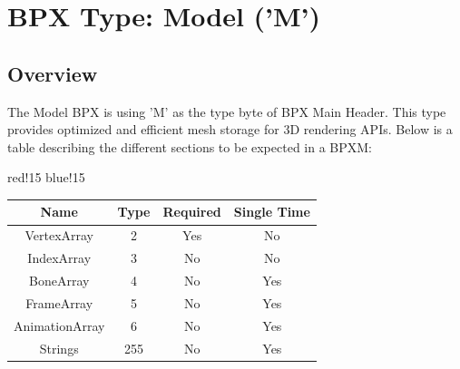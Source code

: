 \section{BPX Type: Model ('M')}

\subsection{Overview}
The Model BPX is using 'M' as the type byte of BPX Main Header. This type provides optimized and efficient mesh storage for 3D rendering APIs.
\newline
Below is a table describing the different sections to be expected in a BPXM:
\begin{center}
    {
        {red!15}
        {blue!15}
        \begin{tabular}{|c|c|c|c|}
            \hline
            \textbf{Name} & \textbf{Type} & \textbf{Required} & \textbf{Single Time} \\
    
            \hline\hline
            VertexArray & 2 & Yes & No \\
            IndexArray & 3 & No & No \\
            BoneArray & 4 & No & Yes \\
            FrameArray & 5 & No & Yes \\
            AnimationArray & 6 & No & Yes \\
            Strings & 255 & No & Yes \\
            \hline
        \end{tabular}
    }
\end{center}

